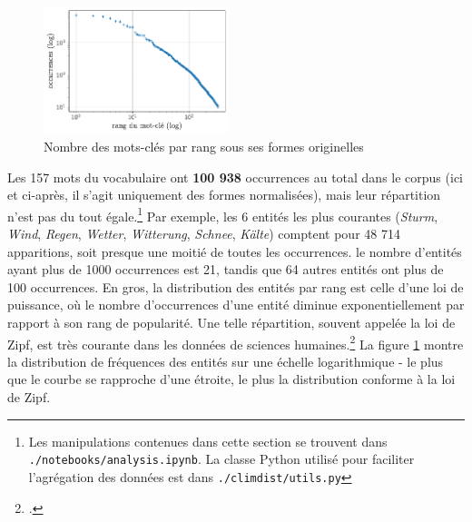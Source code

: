 \documentclass[a4paper,twoside,12pt]{article}
\begin{document}
\begin{figure}
  \begin{center}
    \includegraphics[width=0.48\textwidth]{images/zipf.pdf}
  \end{center}
  \vspace*{-2ex}
  \captionsetup{justification=centering}
  \caption{Nombre des mots-clés par rang sous ses formes originelles}
  \label{fig:zipf}
\end{figure}


Les 157 mots du vocabulaire ont \textbf{100 938} occurrences au total dans le corpus (ici et ci-après, il s'agit uniquement des formes normalisées), mais leur répartition n'est pas du tout égale.\footnote{Les manipulations contenues dans cette section se trouvent dans \texttt{./notebooks/analysis.ipynb}. La classe Python utilisé pour faciliter l'agrégation des données est dans \texttt{./climdist/utils.py}} Par exemple, les 6 entités les plus courantes (\textit{Sturm}, \textit{Wind}, \textit{Regen}, \textit{Wetter}, \textit{Witterung}, \textit{Schnee}, \textit{Kälte}) comptent pour 48 714 apparitions, soit presque une moitié de toutes les occurrences. le nombre d'entités ayant plus de 1000 occurrences est 21, tandis que 64 autres entités ont plus de 100 occurrences. En gros, la distribution des entités par rang est celle d'une loi de puissance, où le nombre d'occurrences d'une entité diminue exponentiellement par rapport à son rang de popularité. Une telle répartition, souvent appelée la loi de Zipf, est très courante dans les données de sciences humaines.\footcite{petruszewycz_loi_1972} La figure \ref{fig:zipf} montre la distribution de fréquences des entités sur une échelle logarithmique - le plus que le courbe se rapproche d'une étroite, le plus la distribution conforme à la loi de Zipf.
\end{document}
